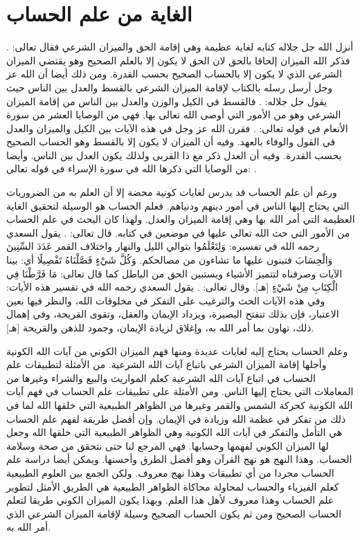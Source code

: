 \section{الغاية من علم الحساب}

أنزل الله جل جلاله كتابه لغاية عظيمة وهي إقامة الحق والميزان الشرعي فقال تعالى:
\quranayah*[42][17]{\footnotesize \surahname*[42]}.
فذكر الله الميزان إلحاقا بالحق لان الحق لا يكون إلا بالعلم الصحيح وهو يقتضي الميزان الشرعي الذي لا يكون إلا بالحساب الصحيح بحسب القدرة. ومن ذلك أيضا أن الله عز وجل أرسل رسله بالكتاب لإقامة الميزان الشرعي بالقسط والعدل بين الناس حيث يقول جل جلاله:
\quranayah*[57][25]{\footnotesize \surahname*[57]}. فالقسط في الكيل والوزن والعدل بين الناس من إقامة الميزان الشرعي وهو من الأمور التي أوصى الله تعالى بها, فهي من الوصايا العشر من سورة الأنعام في قوله تعالى:
\quranayah*[6][152][12]{\footnotesize \surahname*[6]}. فقرن الله عز وجل في هذه الآيات بين الكيل والميزان والعدل في القول والوفاء بالعهد. وفيه أن الميزان لا يكون إلا بالقسط وهو الحساب الصحيح بحسب القدرة. وفيه أن العدل ذكر مع ذا القربى ولذلك يكون العدل بين الناس.
وأيضا من الوصايا التي ذكرها الله في سورة الإسراء في قوله تعالى:
\quranayah*[17][35]{\footnotesize \surahname*[17]}.


ورغم أن علم الحساب قد يدرس لغايات كونية محضة إلا أن العلم به من الضروريات التي يحتاج إليها الناس في أمور دينهم ودنياهم. فعلم الحساب هو الوسيلة لتحقيق الغاية العظيمة التي أمر الله بها وهي إقامة الميزان والعدل. ولهذا كان البحث في علم الحساب من الأمور التي حث الله تعالى عليها في موضعين في كتابه. قال تعالى: \quranayah*[17][12]{\footnotesize \surahname*[17]}.
يقول السعدي رحمه الله في تفسيره:
{ وَلِتَعْلَمُوا } بتوالي الليل والنهار واختلاف القمر { عَدَدَ السِّنِينَ وَالْحِسَابَ } فتبنون عليها ما تشاءون من مصالحكم. { وَكُلَّ شَيْءٍ فَصَّلْنَاهُ تَفْصِيلًا } أي: بينا الآيات وصرفناه لتتميز الأشياء ويستبين الحق من الباطل كما قال تعالى: { مَا فَرَّطْنَا فِي الْكِتَابِ مِنْ شَيْءٍ }
[هـ]. وقال تعالى: \quranayah*[10][5]{\footnotesize \surahname*[10]}.
يقول السعدي رحمه الله في تفسير هذه الأيات:
وفي هذه الآيات الحث والترغيب على التفكر في مخلوقات الله، والنظر فيها بعين الاعتبار، فإن بذلك تنفتح البصيرة، ويزداد الإيمان والعقل، وتقوى القريحة، وفي إهمال ذلك، تهاون بما أمر الله به، وإغلاق لزيادة الإيمان، وجمود للذهن والقريحة
[هـ].

وعلم الحساب يحتاج إليه لغايات عديدة ومنها فهم الميزان الكوني من آيات الله الكونية وأجلها إقامة الميزان الشرعي باتباع آيات الله الشرعية. من الأمثلة لتطبيقات علم الحساب في اتباع آيات الله الشرعية كعلم المواريث والبيع والشراء وغيرها من المعاملات التي يحتاج إليها الناس.  ومن الأمثلة على تطبيقات علم الحساب في فهم آيات الله الكونية كحركة الشمس والقمر وغيرها من الظواهر الطبيعية التي خلقها الله لما في ذلك من تفكر في عظمة الله وزيادة في الإيمان. وإن أفضل طريقة لفهم علم الحساب هي التأمل والتفكر في آيات الله الكونية وهي الظواهر الطبيعية التي خلقها الله وجعل لها الميزان الكوني لفهمها وحسابها. فهي المرجع لنا حتى نتحقق من صحة وسلامة الحساب. وهذا النهج هو نهج القرآن وهو أفضل الطرق وأحسنها. ويمكن أيضا دراسة علم الحساب مجردا من أي تطبيقات وهذا نهج معروف. ولكن الجمع بين العلوم الطبيعية كعلم الفيزياء والحساب لمحاولة محاكاة الظواهر الطبيعية هي الطريق الأمثل لتطوير علم الحساب وهذا معروف لأهل هذا العلم. وبهذا يكون الميزان الكوني طريقا لتعلم الحساب الصحيح ومن ثم يكون الحساب الصحيح وسيلة لإقامة الميزان الشرعي الذي أمر الله به.



